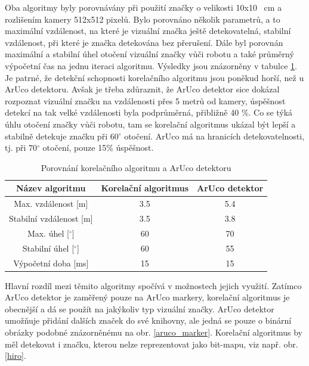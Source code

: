 \documentclass[twoside]{ctuthesis}
\theoremstyle{plain}
\theoremstyle{definition}
\theoremstyle{note}
\begin{document}
Oba algoritmy byly porovnávány při použití značky o velikosti 10x10 \SI{}{cm} a rozlišením kamery 512x512 pixelů. Bylo porovnáno několik parametrů, a to maximální vzdálenost, na které je vizuální značka ještě detekovatelná, stabilní vzdálenost, při které je značka detekována bez přerušení. Dále byl porovnán maximální a stabilní úhel otočení vizuální značky vůči robotu a také průměrný výpočetní čas na jednu iteraci algoritmu. Výsledky jsou znázorněny v tabulce \ref{porovnani}. Je patrné, že detekční schopnosti korelačního algoritmu jsou poněkud horší, než u ArUco detektoru. Avšak je třeba zdůraznit, že ArUco detektor sice dokázal rozpoznat vizuální značku na vzdálenosti přes 5 metrů od kamery, úspěšnost detekcí na tak velké vzdálenosti byla podprůměrná, přibližně 40 \%. Co se týká úhlu otočení značky vůči robotu, tam se korelační algoritmus ukázal být lepší a stabilně detekuje značku při 60$^\circ$ otočení. ArUco má na hranicích detekovatelnosti, tj. při 70$^\circ$ otočení, pouze 15\% úspěšnost.

\begin{table}[hbt]
	\centering
	\caption{Porovnání korelačního algoritmu a ArUco detektoru}
	\label{porovnani}
	\begin{tabular}{|c|c|c|}
		\hline
		Název algoritmu              & Korelační algoritmus & ArUco detektor \\ \hline
		Max. vzdálenost {[}m{]}      & 3.5                 & 5.4           \\ \hline
		Stabilní vzdálenost {[}m{]}  & 3.5                 & 3.8           \\ \hline
		Max. úhel {[}$^\circ${]}     & 60                   & 70             \\ \hline
		Stabilní úhel {[}$^\circ${]} & 60                   & 55             \\ \hline
		Výpočetní doba {[}ms{]}      & 15                   & 15             \\ \hline
	\end{tabular}
\end{table}
Hlavní rozdíl mezi těmito algoritmy spočívá v možnostech jejich využití. Zatímco ArUco detektor je zaměřený pouze na ArUco markery, korelační algoritmus je obecnější a dá se použít na jakýkoliv typ vizuální značky. ArUco detektor umožňuje přidání dalších značek do své knihovny, ale jedná se pouze o binární obrázky podobné znázorněnému na obr. \ref{aruco_marker}. Korelační algoritmus by měl detekovat i značku, kterou nelze reprezentovat jako bit-mapu, viz např. obr. \ref{hiro}.
\end{document}

